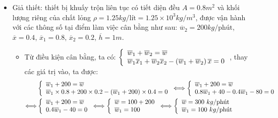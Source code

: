 \begin{itemize}
    \item Giả thiết: thiết bị khuấy trộn liên tục có tiết diện đều $A = 0.8\unit{m^2}$ và khối lượng riêng của chất lỏng $\rho = 1.25 \unit{kg/\textrm{lít}} = 1.25 \times 10^3 \unit{kg/m^3}$, được vận hành với các thông số tại điểm làm việc cân bằng như sau: $\overline{w}_2 = 200 \unit{kg/\textrm{phút}}$, $\overline{x} = 0.4$, $\overline{x}_1 = 0.8$, $\overline{x}_2 = 0.2$, $\overline{h} = 1 \unit{m}$.
        \begin{itemize}
            \item Từ điều kiện cân bằng, ta có: $\left\{\begin{array}{l}\overline{w}_1 + \overline{w}_2 = \overline{w}\\ \overline{w}_1\overline{x}_1 + \overline{w}_2\overline{x}_2 - \left({\overline{w}_1 + \overline{w}_2}\right)\overline{x} = 0\end{array}\right.$, thay các giá trị vào, ta được:
                \begin{align*}
                    & \left\{\begin{array}{l}
                         \overline{w}_1 + 200 = \overline{w}\\
                        \overline{w}_1 \times 0.8 + 200 \times 0.2 - \left({\overline{w}_1 + 200}\right)\times 0.4 = 0
                    \end{array}\right.
                    \Longleftrightarrow
                    \left\{\begin{array}{l}
                         \overline{w}_1 + 200 = \overline{w}\\
                        0.8\overline{w}_1 + 40 - 0.4\overline{w}_1 - 80 = 0
                    \end{array}\right.\\
                    \Longleftrightarrow &
                    \left\{\begin{array}{l}
                         \overline{w}_1 + 200 = \overline{w}\\
                        0.4\overline{w}_1 - 40 = 0
                    \end{array}\right.
                    \Longleftrightarrow
                    \left\{\begin{array}{l}
                         \overline{w} = 100 + 200 \\
                        \overline{w}_1 = 100
                    \end{array}\right.
                    \Longleftrightarrow
                    \left\{\begin{array}{l}
                         \overline{w} = 300 ~kg/\textrm{phút}\\
                        \overline{w}_1 = 100 ~kg/\textrm{phút}
                    \end{array}\right.
                \end{align*}


\end{itemize}
\end{itemize}
